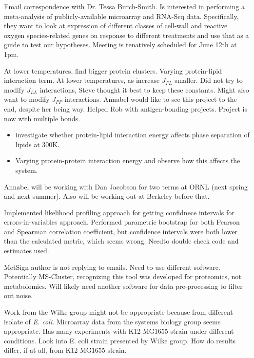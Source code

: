 \documentclass[11pt]{labbook}
\begin{document}
Email correspondence with Dr. Tessa Burch-Smith. Is interested in performing a meta-analysis of publicly-available microarray and RNA-Seq data. Specifically, they want to look at expression of different classes of cell-wall and reactive oxygen species-related genes on response to different treatments and use that as a guide to test our hypotheses. Meeting is tenatively scheduled for June 12th at 1pm.


At lower temperatures, find bigger protein clusters. Varying protein-lipid interaction term. At lower temperatures, as increase $J_{PL}$ smaller. Did not try to modify $J_{LL}$ interactions, Steve thought it best to keep these constants. Might also want to modify $J_{PP}$ interactions. Annabel would like to see this project to the end, despite her being way. Helped Rob with antigen-bonding projects. Project is now with multiple bonds.  


\begin{itemize}
\item investigate whether protein-lipid interaction energy affects phase separation of lipids at 300K.
\item Varying protein-protein interaction energy and observe how this affects the system.
\end{itemize}



Annabel will be working with Dan Jacobson for two terms at ORNL (next spring and next summer). Also will be working out at Berkeley before that. 


Implemented likelihood profiling approach for getting confidnece intervals for errors-in-variables approach. Performed parametric bootstrap for both Pearson and Spearman correlation coefficient, but confidence intervals were both lower than the calculated metric, which seems wrong. Needto double check code and estimates used.

MetSign author is not replying to emails. Need to use different software. Potentially MS-Cluster, recognizing this tool was developed for proteomics, not metabolomics. Will likely need another software for data pre-processing to filter out noise. 

Work from the Wilke group might not be appropriate because from different isolate of \textit{E. coli}. Microarray data from the systems biology group seems appropriate. Has many experiments with K12 MG1655 strain under different conditions. Look into E. coli strain presented by Wilke group. How do results differ, if at all, from K12 MG1655 strain. 
\end{document}
